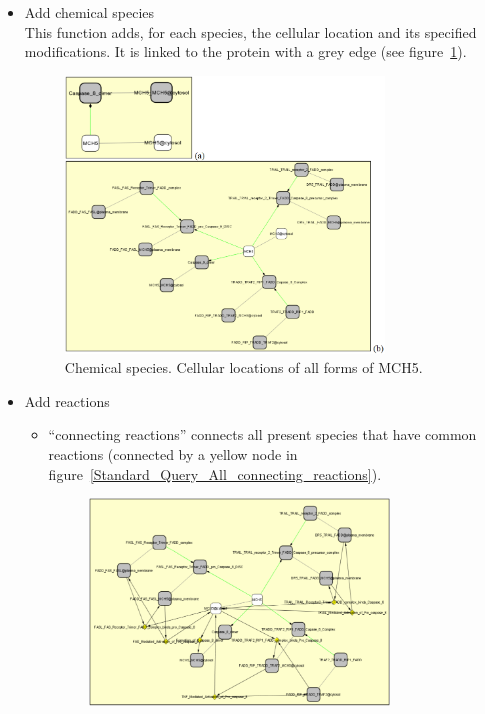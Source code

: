\begin{itemize}
\begin{figure}[h]
\end{figure}
\item Add chemical species\\
This function adds, for each species, the cellular location and its specified modifications. It is linked to the protein with a grey edge (see figure~\ref{Standard_Query_Chemical_species}).
\begin{figure}[h]
\centering
\includegraphics[width=0.8\textwidth]{graphics/Standard_Query_Chemical_species}
\caption{Chemical species. Cellular locations of all forms of MCH5.}
\label{Standard_Query_Chemical_species}
\end{figure}
\item Add reactions
\begin{itemize}
\item “connecting reactions” connects all present species that have common reactions (connected by a yellow node in figure~\ref{Standard_Query_All_connecting_reactions}).
\begin{figure}[h]
\centering
\includegraphics[width=0.8\textwidth]{graphics/Standard_Query_All_connecting_reactions}

\end{figure}
\end{itemize}
\end{itemize}
